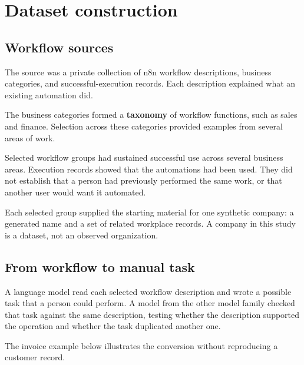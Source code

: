 \documentclass[11pt]{article}
\begin{document}
\section{Dataset construction}
\subsection{Workflow sources}
The source was a private collection of n8n workflow descriptions, business categories, and successful-execution records. Each description explained what an existing automation did.

The business categories formed a \textbf{taxonomy} of workflow functions, such as sales and finance. Selection across these categories provided examples from several areas of work.

Selected workflow groups had sustained successful use across several business areas. Execution records showed that the automations had been used. They did not establish that a person had previously performed the same work, or that another user would want it automated.

Each selected group supplied the starting material for one synthetic company: a generated name and a set of related workplace records. A company in this study is a dataset, not an observed organization.

\subsection{From workflow to manual task}
A language model read each selected workflow description and wrote a possible task that a person could perform. A model from the other model family checked that task against the same description, testing whether the description supported the operation and whether the task duplicated another one.

The invoice example below illustrates the conversion without reproducing a customer record.
\end{document}
